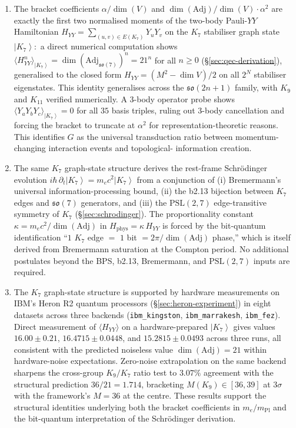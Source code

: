 \documentclass[11pt]{article}
\newcommand{\so}{\mathfrak{so}}
\newcommand{\Adj}{\mathrm{Adj}}
\newcommand{\ket}[1]{\left|#1\right\rangle}
\newcommand{\mPl}{m_{\mathrm{Pl}}}
\newcommand{\PSL}{\mathrm{PSL}}
\begin{document}
\begin{enumerate}
\item The bracket coefficients $\alpha/\dim(V)$ and
  $\dim(\Adj)/\dim(V)\cdot \alpha^2$ are exactly the first two
  normalised moments of the two-body Pauli-$YY$ Hamiltonian
  $H_{YY} = \sum_{(u,v) \in E(K_7)} Y_u Y_v$ on the $K_7$ stabiliser
  graph state $\ket{K_7}$:\ a direct numerical computation shows
  $\langle H_{YY}^n \rangle_{\ket{K_7}} = \dim(\Adj_{\so(7)})^n = 21^n$
  for all $n \geq 0$ (\S\ref{sec:qec-derivation}), generalised to the
  closed form $H_{YY} = (M^2 - \dim V)/2$ on all $2^N$ stabiliser
  eigenstates.  This identity generalises across the $\so(2n+1)$
  family, with $K_9$ and $K_{11}$ verified numerically.  A 3-body
  operator probe shows $\langle Y_aY_bY_c\rangle_{\ket{K_7}} = 0$ for
  all $35$ basis triples, ruling out 3-body cancellation and forcing
  the bracket to truncate at $\alpha^2$ for representation-theoretic
  reasons.  This identifies $G$ as the universal transduction ratio
  between momentum-changing interaction events and topological-
  information creation.

\item The same $K_7$ graph-state structure derives the rest-frame
  Schr\"odinger evolution
  $i\hbar\, \partial_t \ket{K_7} = m_e c^2 \ket{K_7}$ from a
  conjunction of (i) Bremermann's universal information-processing
  bound, (ii) the b2.13 bijection between $K_7$ edges and $\so(7)$
  generators, and (iii) the $\PSL(2,7)$ edge-transitive symmetry of
  $K_7$ (\S\ref{sec:schrodinger}).  The proportionality constant
  $\kappa = m_e c^2 / \dim(\Adj)$ in $H_{\text{phys}} = \kappa\, H_{YY}$
  is forced by the bit-quantum identification ``$1$ $K_7$ edge $=$ $1$
  bit $= 2\pi/\dim(\Adj)$ phase,'' which is itself derived from
  Bremermann saturation at the Compton period.  No additional
  postulates beyond the BPS, b2.13, Bremermann, and $\PSL(2,7)$
  inputs are required.

\item The $K_7$ graph-state structure is supported by hardware
  measurements on IBM's Heron R2 quantum processors
  (\S\ref{sec:heron-experiment}) in eight datasets across three
  backends (\texttt{ibm\_kingston}, \texttt{ibm\_marrakesh},
  \texttt{ibm\_fez}).  Direct measurement of
  $\langle H_{YY}\rangle$ on a hardware-prepared $\ket{K_7}$ gives
  values $16.00 \pm 0.21$, $16.4715 \pm 0.0448$, and
  $15.2815 \pm 0.0493$ across three runs, all consistent with the
  predicted noiseless value $\dim(\Adj) = 21$ within hardware-noise
  expectations.  Zero-noise extrapolation on the same backend
  sharpens the cross-group $K_9/K_7$ ratio test to $3.07\%$
  agreement with the structural prediction $36/21 = 1.714$,
  bracketing $M(K_9) \in [36, 39]$ at $3\sigma$ with the framework's
  $M = 36$ at the centre.  These results support the structural
  identities underlying both the bracket coefficients in $m_e/\mPl$
  and the bit-quantum interpretation of the Schr\"odinger
  derivation.
\end{enumerate}
\end{document}
